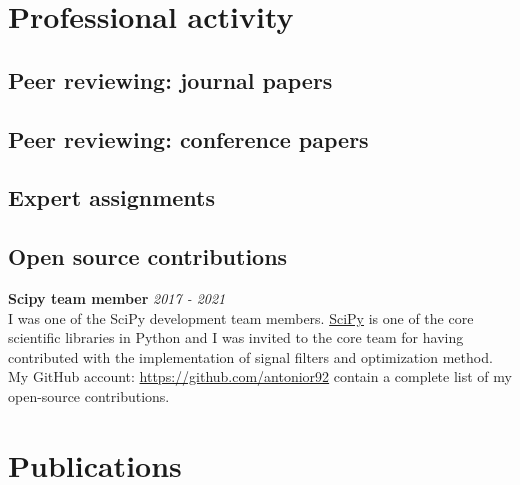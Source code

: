 \documentclass[10pt,letterpaper]{article} %
\begin{document}
{{{{{{{{{{{{\section*{Professional activity}

\subsection*{Peer reviewing: journal papers}

{%

\subsection*{Peer reviewing: conference papers}

{%

\subsection*{Expert assignments}

{%

\newpage

\subsection*{Open source contributions}

{\bf Scipy team member} \hfill {\em 2017 - 2021} \\
I was one of the SciPy development team members.
\href{https://www.scipy.org}{SciPy} is one of the core scientific libraries in Python and I was invited to the core team
for having contributed with the implementation of signal filters
and optimization method.
My GitHub account: \href{https://github.com/antonior92}{https://github.com/antonior92}
contain a complete list of my open-source contributions.

\section*{Publications}

}}}}}}}}}}}}}}}
\end{document}
